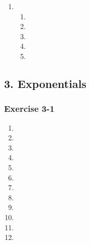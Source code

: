 {\begin{multicols}{3}
\begin{enumerate}[noitemsep, label=\textbf{\arabic*}. ]
\item %
\begin{enumerate}[noitemsep,label=\textbf{(\alph*)}]
\item %
\item %
\item %
\item %
\item %
   

\end{enumerate}
\end{enumerate}

\end{multicols}

\subsection* {3. Exponentials}
\begin{multicols}{3}
\subsubsection*{Exercise 3-1} %

\begin{enumerate}[label=\textbf{\arabic*}., noitemsep]
 \item %
 \item %
 \item %
 \item %
 \item %
 \item %
 \item %
 \item %
 \item %
 \item %
 \item %
 \item %
\end{enumerate}


\end{multicols}}
